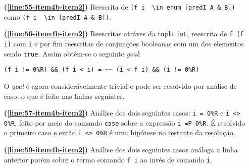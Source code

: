 \begin{enumerate}[label=\textbf{\roman*.}]
\begin{enumerate}[label=\textbf{\roman{enumi}.(\alph*)}]
\begin{enumerate}[label=\textbf{(\alph{enumii}.\arabic*)}]
\begin{enumerate}[listparindent=\parindent]
\begin{itemize}
                                                \item[\textbf{(\ref{line:55-item4b-item2})}] Reescrita de \lstinline[language=coq]|(f i  \in enum [predI A & B])| como \lstinline[language=coq]|(f i  \in [predI A & B])|.
                                                
                                                \item[\textbf{(\ref{line:56-item4b-item2})}] Reescritas atráves da tupla \lstinline[language=coq]|inE|, reescrita de \lstinline[language=coq]!f (f i)! com \lstinline[language=coq]!i! e por fim reescritas de conjunções booleanas com um dos elementos sendo \lstinline[language=coq]!true!. Assim obtêm-se o seguinte \textit{goal}:
                                                        \begin{lstlisting}[language=coq,frame=single,tabsize=1]
(f i != 0%R) && (f i < i) = ~~ (i < f i) && (i != 0%R)
                                                        \end{lstlisting}
                                                O \textit{goal} é agora considerávelmente trivial e pode ser resolvido por análise de caso, o que é feito nas linhas seguintes.

                                                \item[\textbf{(\ref{line:57-item4b-item2})}] Análise dos dois seguintes casos: \lstinline[language=coq]|i = 0%R| e \lstinline[language=coq]|i <> 0%R|, feito por meio do comando \lstinline[language=coq]|case| sobre a expressão \lstinline[language=coq]|i =P 0%R|. É resolvido o primeiro caso e então \lstinline[language=coq]|i <> 0%R| é uma hipótese no restante da resolução.
                                                
                                                \item[\textbf{(\ref{line:59-item4b-item2})}] Análise dos dois seguintes casos análoga a linha anterior porém sobre o termo comando \lstinline[language=coq]|f i| ao invés de comando \lstinline[language=coq]|i|.
                                                

\end{itemize}
\end{enumerate}
\end{enumerate}
\end{enumerate}
\end{enumerate}

